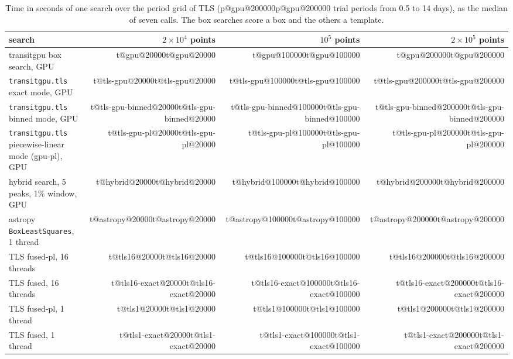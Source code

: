 \documentclass{aastex631}
\makeatletter
\newcommand{\T}[2]{\ifcsname t@#1@#2\endcsname\csname t@#1@#2\endcsname\else[\texttt{\detokenize{#1, #2}}]\fi}
\newcommand{\NP}[2]{\ifcsname p@#1@#2\endcsname\csname p@#1@#2\endcsname\else[\texttt{\detokenize{#1, #2}}]\fi}
\makeatother
\begin{document}
\begin{table}[htbp]
\centering
\caption{Time in seconds of one search over the period grid of TLS (\NP{gpu}{200000} trial periods from 0.5 to 14 days), as the median of seven calls. The box searches score a box and the others a template.}\label{tab:cpu}
\small
\begin{tabular}{lrrr}
\toprule
search & $2\times10^4$ points & $10^5$ points & $2\times10^5$ points \\
\midrule
transitgpu box search, GPU & \T{gpu}{20000} & \T{gpu}{100000} & \T{gpu}{200000} \\
\texttt{transitgpu.tls} exact mode, GPU & \T{tls-gpu}{20000} & \T{tls-gpu}{100000} & \T{tls-gpu}{200000} \\
\texttt{transitgpu.tls} binned mode, GPU & \T{tls-gpu-binned}{20000} & \T{tls-gpu-binned}{100000} & \T{tls-gpu-binned}{200000} \\
\texttt{transitgpu.tls} piecewise-linear mode (gpu-pl), GPU & \T{tls-gpu-pl}{20000} & \T{tls-gpu-pl}{100000} & \T{tls-gpu-pl}{200000} \\
hybrid search, 5 peaks, 1\% window, GPU & \T{hybrid}{20000} & \T{hybrid}{100000} & \T{hybrid}{200000} \\
astropy \texttt{BoxLeastSquares}, 1 thread & \T{astropy}{20000} & \T{astropy}{100000} & \T{astropy}{200000} \\
TLS fused-pl, 16 threads & \T{tls16}{20000} & \T{tls16}{100000} & \T{tls16}{200000} \\
TLS fused, 16 threads & \T{tls16-exact}{20000} & \T{tls16-exact}{100000} & \T{tls16-exact}{200000} \\
TLS fused-pl, 1 thread & \T{tls1}{20000} & \T{tls1}{100000} & \T{tls1}{200000} \\
TLS fused, 1 thread & \T{tls1-exact}{20000} & \T{tls1-exact}{100000} & \T{tls1-exact}{200000} \\
\bottomrule
\end{tabular}
\end{table}
\end{document}
